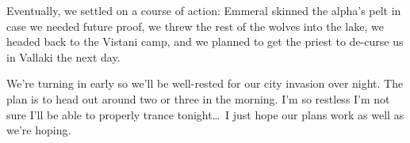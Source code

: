 Eventually, we settled on a course of action: Emmeral skinned the alpha's pelt in case we needed future proof, we threw the rest of the wolves into the lake, we headed back to the Vistani camp, and we planned to get the priest to de-curse us in Vallaki the next day.

We're turning in early so we'll be well-rested for our city invasion over night. The plan is to head out around two or three in the morning. I'm so restless I'm not sure I'll be able to properly trance tonight\dots\ I just hope our plans work as well as we're hoping.

\sleep

